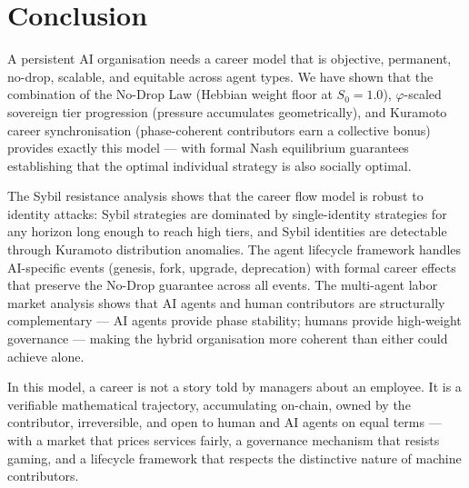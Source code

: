 \documentclass[12pt]{article}
\newcommand{\PHI}{\varphi}
\begin{document}
\section{Conclusion}
\label{sec:conclusion}

A persistent AI organisation needs a career model that is objective, permanent,
no-drop, scalable, and equitable across agent types.  We have shown that the
combination of the No-Drop Law (Hebbian weight floor at $S_0 = 1.0$),
$\PHI$-scaled sovereign tier progression (pressure accumulates geometrically),
and Kuramoto career synchronisation (phase-coherent contributors earn a
collective bonus) provides exactly this model — with formal Nash equilibrium
guarantees establishing that the optimal individual strategy is also socially
optimal.

The Sybil resistance analysis shows that the career flow model is robust to
identity attacks: Sybil strategies are dominated by single-identity strategies
for any horizon long enough to reach high tiers, and Sybil identities are
detectable through Kuramoto distribution anomalies.  The agent lifecycle
framework handles AI-specific events (genesis, fork, upgrade, deprecation)
with formal career effects that preserve the No-Drop guarantee across all events.
The multi-agent labor market analysis shows that AI agents and human contributors
are structurally complementary — AI agents provide phase stability; humans
provide high-weight governance — making the hybrid organisation more coherent
than either could achieve alone.

In this model, a career is not a story told by managers about an employee.
It is a verifiable mathematical trajectory, accumulating on-chain, owned by
the contributor, irreversible, and open to human and AI agents on equal terms —
with a market that prices services fairly, a governance mechanism that resists
gaming, and a lifecycle framework that respects the distinctive nature of
machine contributors.
\end{document}
